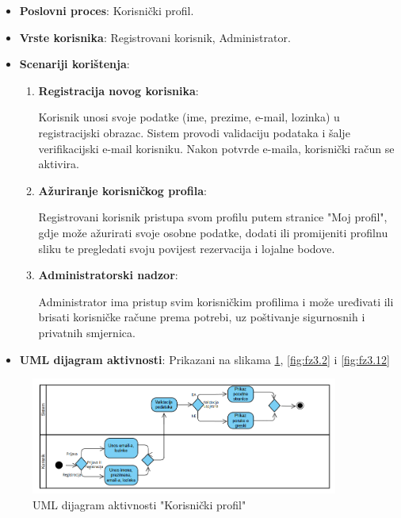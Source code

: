 \begin{itemize}
    \item \textbf{Poslovni proces}: Korisnički profil.
    \item \textbf{Vrste korisnika}: Registrovani korisnik, Administrator.
    \item \textbf{Scenariji korištenja}:
    \begin{enumerate}
        \item \textbf{Registracija novog korisnika}: 

        
        Korisnik unosi svoje podatke (ime, prezime, e-mail, lozinka) u registracijski obrazac. Sistem provodi validaciju podataka i šalje verifikacijski e-mail korisniku. Nakon potvrde e-maila, korisnički račun se aktivira.
        
        \item \textbf{Ažuriranje korisničkog profila}: 

        
        Registrovani korisnik pristupa svom profilu putem stranice "Moj profil", gdje može ažurirati svoje osobne podatke, dodati ili promijeniti profilnu sliku te pregledati svoju povijest rezervacija i lojalne bodove.
        
        \item \textbf{Administratorski nadzor}: 

        
        Administrator ima pristup svim korisničkim profilima i može uređivati ili brisati korisničke račune prema potrebi, uz poštivanje sigurnosnih i privatnih smjernica.
    \end{enumerate}
    \item \textbf{UML dijagram aktivnosti}: Prikazani na slikama \ref{fig:fz3.1}, \ref{fig:fz3.2} i \ref{fig:fz3.12}
\end{itemize}

\begin{figure}[H]
    \centering
    \includegraphics[width=0.9\textwidth]{Slike/fz3.1.png}
    \caption{UML dijagram aktivnosti "Korisnički profil"}
    \label{fig:fz3.1}
\end{figure}

